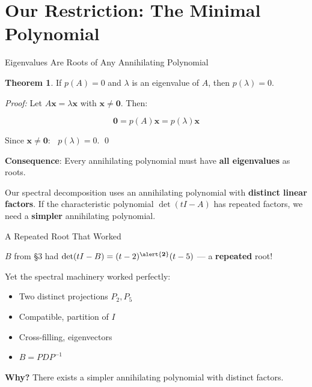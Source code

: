 \documentclass[10pt]{beamer}
\theoremstyle{definition}
\newtheorem{thm}{Theorem}[section]
\newcommand{\x}[1]{\alert{\textbf{#1}}}
\begin{document}
\section{Our Restriction: The Minimal Polynomial}


\begin{frame}[shrink=5]{Eigenvalues Are Roots of Any Annihilating Polynomial}

\begin{thm}
If $p(A) = 0$ and $\lambda$ is an eigenvalue of $A$, then $p(\lambda) = 0$.
\end{thm}

\vfill

\textit{Proof:} Let $A\mathbf{x} = \lambda\mathbf{x}$ with $\mathbf{x} \neq \mathbf{0}$. Then:

$$\mathbf{0} = p(A)\mathbf{x} = p(\lambda)\mathbf{x}$$

Since $\mathbf{x} \neq \mathbf{0}$: $\;\;p(\lambda) = 0$. \qed

\vfill\pause

\x{Consequence}: Every annihilating polynomial must have \x{all eigenvalues} as roots.

\vfill

Our spectral decomposition uses an annihilating polynomial with \x{distinct linear factors}. If the characteristic polynomial $\det(tI - A)$ has repeated factors, we need a \x{simpler} annihilating polynomial.

\end{frame}


\begin{frame}{A Repeated Root That Worked}

$B$ from \S3 had $\det(tI - B) = (t-2)^{\x{2}}(t-5)$ --- a \x{repeated} root!

\vfill

Yet the spectral machinery worked perfectly:
\begin{itemize}
\item Two distinct projections $P_2, P_5$ \;\checkmark
\item Compatible, partition of $I$ \;\checkmark
\item Cross-filling, eigenvectors \;\checkmark
\item $B = PDP^{-1}$ \;\checkmark
\end{itemize}

\vfill\pause

\x{Why?} There exists a simpler annihilating polynomial with distinct factors.

\end{frame}
\end{document}
